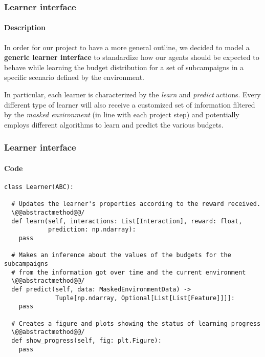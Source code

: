 \begin{frame}

\frametitle{Learner interface}
\framesubtitle{Description}

In order for our project to have a more general outline, we decided to model a \textbf{generic learner interface} to standardize how our agents should be expected to behave while learning the budget distribution for a set of subcampaigns in a specific scenario defined by the environment.

In particular, each learner is characterized by the \textit{learn} and \textit{predict} actions.
Every different type of learner will also receive a customized set of information filtered by the \textit{masked environment} (in line with each project step) and potentially employs different algorithms to learn and predict the various budgets.

\end{frame}


\begin{frame}[fragile]

\frametitle{Learner interface}
\framesubtitle{Code}

%

\begin{lstlisting}[style=Python, basicstyle=\tiny, numbers=none, framexrightmargin=-20pt]
class Learner(ABC):

  # Updates the learner's properties according to the reward received.
  \@@abstractmethod@@/
  def learn(self, interactions: List[Interaction], reward: float,
            prediction: np.ndarray):
    pass

  # Makes an inference about the values of the budgets for the subcampaigns
  # from the information got over time and the current environment
  \@@abstractmethod@@/
  def predict(self, data: MaskedEnvironmentData) ->
              Tuple[np.ndarray, Optional[List[List[Feature]]]]:
    pass

  # Creates a figure and plots showing the status of learning progress
  \@@abstractmethod@@/
  def show_progress(self, fig: plt.Figure):
    pass

\end{lstlisting}

\end{frame}

